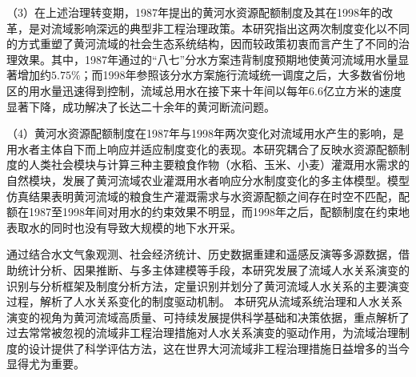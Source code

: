 \begin{cabstract}
（3）在上述治理转变期，1987年提出的黄河水资源配额制度及其在1998年的改革，是对流域影响深远的典型非工程治理政策。本研究指出这两次制度变化以不同的方式重塑了黄河流域的社会\textendash{}生态系统结构，因而较政策初衷而言产生了不同的治理效果。其中，1987年通过的“八七”分水方案违背制度预期地使黄河流域用水量显著增加约$5.75\%$；而1998年参照该分水方案施行流域统一调度之后，大多数省份地区的用水量迅速得到控制，流域总用水在接下来十年间以每年6.6亿立方米的速度显著下降，成功解决了长达二十余年的黄河断流问题。

（4）黄河水资源配额制度在1987年与1998年两次变化对流域用水产生的影响，是用水者主体自下而上响应并适应制度变化的表现。本研究耦合了反映水资源配额制度的人类社会模块与计算三种主要粮食作物（水稻、玉米、小麦）灌溉用水需求的自然模块，发展了黄河流域农业灌溉用水者响应分水制度变化的多主体模型。模型仿真结果表明黄河流域的粮食生产灌溉需求与水资源配额之间存在时空不匹配，配额在1987至1998年间对用水的约束效果不明显，而1998年之后，配额制度在约束地表取水的同时也没有导致大规模的地下水开采。

通过结合水文气象观测、社会经济统计、历史数据重建和遥感反演等多源数据，借助统计分析、因果推断、与多主体建模等手段，本研究发展了流域人\textendash{}水关系演变的识别与分析框架及制度分析方法，定量识别并划分了黄河流域人\textendash{}水关系的主要演变过程，解析了人\textendash{}水关系变化的制度驱动机制。
本研究从流域系统治理和人\textendash{}水关系演变的视角为黄河流域高质量、可持续发展提供科学基础和决策依据，重点解析了过去常常被忽视的流域非工程治理措施对人\textendash{}水关系演变的驱动作用，为流域治理制度的设计提供了科学评估方法，这在世界大河流域非工程治理措施日益增多的当今显得尤为重要。


\end{cabstract}



